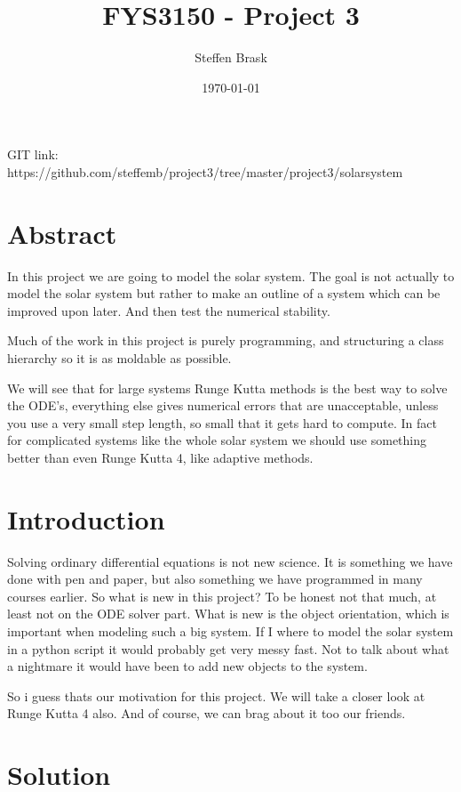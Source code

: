 \documentclass[norsk,a4paper,12pt]{article}
\title{FYS3150 - Project 3}
\author{Steffen Brask}
\date{\today}
\begin{document}
\maketitle

\begin{center}
GIT link: https://github.com/steffemb/project3/tree/master/project3/solarsystem
\end{center}


\newpage


\section*{Abstract}

In this project we are going to model the solar system. The goal is not actually to model the solar system but rather to
make an outline of a system which can be improved upon later. And then test the numerical stability.

Much of the work in this project is purely programming, and structuring a class hierarchy so it is as moldable as possible.

We will see that for large systems Runge Kutta methods is the best way to solve the ODE's, everything else gives numerical errors
that are unacceptable, unless you use a very small step length, so small that it gets hard to compute. In fact for complicated systems like the
whole solar system we should use something better than even Runge Kutta 4, like adaptive methods. 


\section*{Introduction}

Solving ordinary differential equations is not new science. It is something we have done with pen and paper, but also something
we have programmed in many courses earlier. So what is new in this project? To be honest not that much, at least not on the ODE
solver part. What is new is the object orientation, which is important when modeling such a big system. If I where to model
the solar system in a python script it would probably get very messy fast. Not to talk about what a nightmare it would have been 
to add new objects to the system.

So i guess thats our motivation for this project. We will take a closer look at Runge Kutta 4 also. And of course, we can brag about
it too our friends.

\section*{Solution}
\end{document}
